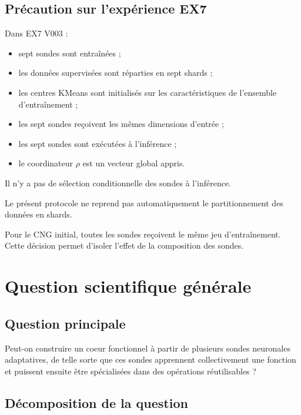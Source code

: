 \documentclass[11pt,a4paper]{article}
\begin{document}
\subsection{Précaution sur l'expérience EX7}

Dans EX7 V003 :

\begin{itemize}
    \item sept sondes sont entraînées ;
    \item les données supervisées sont réparties en sept shards ;
    \item les centres KMeans sont initialisés sur les caractéristiques
    de l'ensemble d'entraînement ;
    \item les sept sondes reçoivent les mêmes dimensions d'entrée ;
    \item les sept sondes sont exécutées à l'inférence ;
    \item le coordinateur $\rho$ est un vecteur global appris.
\end{itemize}

Il n'y a pas de sélection conditionnelle des sondes
à l'inférence.

Le présent protocole ne reprend pas automatiquement
le partitionnement des données en shards.

Pour le CNG initial, toutes les sondes reçoivent
le même jeu d'entraînement. Cette décision permet
d'isoler l'effet de la composition des sondes.

\section{Question scientifique générale}

\subsection{Question principale}

Peut-on construire un coeur fonctionnel à partir
de plusieurs sondes neuronales adaptatives, de telle sorte
que ces sondes apprennent collectivement une fonction
et puissent ensuite être spécialisées dans des opérations
réutilisables ?

\subsection{Décomposition de la question}
\end{document}

